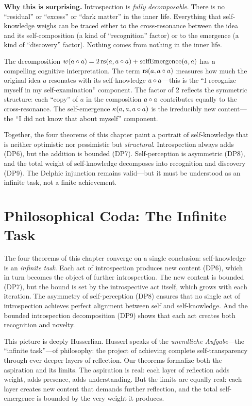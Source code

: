 \begin{surprisebox}
\textbf{Why this is surprising.} Introspection is \emph{fully
decomposable}. There is no ``residual'' or ``excess'' or ``dark matter''
in the inner life. Everything that self-knowledge weighs can be traced
either to the cross-resonance between the idea and its self-composition
(a kind of ``recognition'' factor) or to the emergence (a kind of
``discovery'' factor). Nothing comes from nothing in the inner life.
\end{surprisebox}

The decomposition $w(a \circ a) = 2\,\mathrm{rs}(a, a \circ a) +
\mathrm{selfEmergence}(a,a)$ has a compelling cognitive interpretation.
The term $\mathrm{rs}(a, a \circ a)$ measures how much the original idea
$a$ resonates with its self-knowledge $a \circ a$---this is the
``I recognize myself in my self-examination'' component. The factor of
2 reflects the symmetric structure: each ``copy'' of $a$ in the
composition $a \circ a$ contributes equally to the cross-resonance.
The self-emergence $\kappa(a, a, a \circ a)$ is the irreducibly
new content---the ``I did not know that about myself'' component.

Together, the four theorems of this chapter paint a portrait of
self-knowledge that is neither optimistic nor pessimistic but
\emph{structural}. Introspection always adds (DP6), but the addition is
bounded (DP7). Self-perception is asymmetric (DP8), and the total weight
of self-knowledge decomposes into recognition and discovery (DP9). The
Delphic injunction remains valid---but it must be understood as an
infinite task, not a finite achievement.

\section{Philosophical Coda: The Infinite Task}

The four theorems of this chapter converge on a single conclusion:
self-knowledge is an \emph{infinite task}. Each act of introspection
produces new content (DP6), which in turn becomes the object of further
introspection. The new content is bounded (DP7), but the bound is set
by the introspective act itself, which grows with each iteration. The
asymmetry of self-perception (DP8) ensures that no single act of
introspection achieves perfect alignment between self and self-knowledge.
And the bounded introspection decomposition (DP9) shows that each act
creates both recognition and novelty.

This picture is deeply Husserlian. Husserl speaks of the
\emph{unendliche Aufgabe}---the ``infinite task''---of philosophy: the
project of achieving complete self-transparency through ever deeper
layers of reflection. Our theorems formalize both the aspiration and its
limits. The aspiration is real: each layer of reflection adds weight,
adds presence, adds understanding. But the limits are equally real: each
layer creates new content that demands further reflection, and the total
self-emergence is bounded by the very weight it produces.

